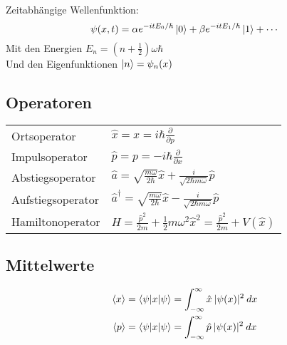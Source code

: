 \documentclass[landscape,8pt]{scrartcl}
\begin{document}
\begin{multicols}{3}

\noindent Zeitabhängige Wellenfunktion:
\[
	\psi(x,t)
		= \alpha e^{-itE_0/\hbar}\ket 0 
		+ \beta  e^{-itE_1/\hbar}\ket 1  
		+ \cdots
\]
Mit den Energien $E_n = \left(n+\frac 12\right) \omega \hbar $ \\
Und den Eigenfunktionen $\ket n = \psi_n(x)$\\

\subsection{Operatoren}
\begin{tabular}{ll}
Ortsoperator 			& $\hat x = x = i \hbar \frac{\partial}{\partial p}$	\\
Impulsoperator 			& $\hat p = p = -i\hbar \frac{\partial}{\partial x}$	\\
Abstiegsoperator 		& $\hat a = \sqrt{\frac{m \omega}{2\hbar}} \hat x + \frac{i}{\sqrt{2\hbar m \omega}} \hat p$	\\
Aufstiegsoperator 		& $\hat a^\dagger = \sqrt{\frac{m \omega}{2\hbar}} \hat x - \frac{i}{\sqrt{2\hbar m \omega}} \hat p$ \\
Hamiltonoperator		& $H=\frac{\hat p^2}{2m}+\frac{1}{2}m\omega^2\hat x^2 = \frac{\hat p^2}{2m} + V(\hat x)$
\end{tabular}

\subsection{Mittelwerte}
\begin{align*}
\braket{x}	&=\braket{\psi|x|\psi}=\int_{-\infty}^{\infty} \hat x\:|\psi(x)|^2\:dx	\\
\braket{p}	&=\braket{\psi|x|\psi}=\int_{-\infty}^{\infty} \hat p\:|\psi(x)|^2\:dx
\end{align*}

\end{multicols}
\end{document}
